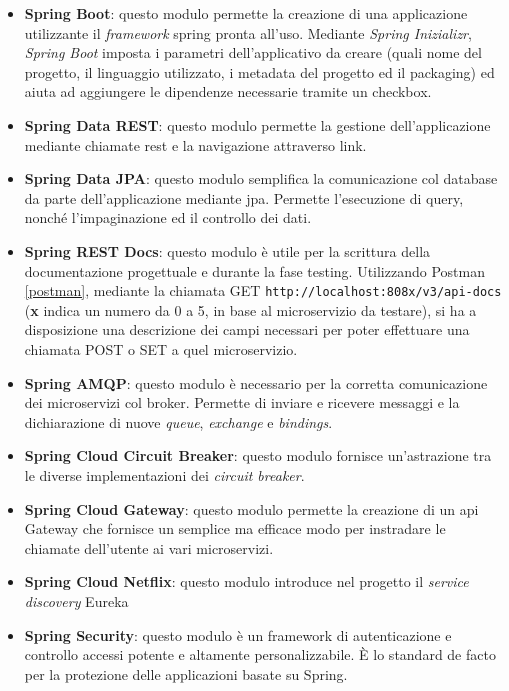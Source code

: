 \begin{itemize}
    \item \textbf{Spring Boot}: questo modulo permette la creazione di una applicazione utilizzante il \textit{framework} \Gls{spring} pronta all'uso. Mediante \textit{Spring Inizializr}, \textit{Spring Boot} imposta i parametri dell'applicativo da creare (quali nome del progetto, il linguaggio utilizzato, i metadata del progetto ed il packaging) ed aiuta ad aggiungere le dipendenze necessarie tramite un checkbox.
    \item \textbf{Spring Data REST}: questo modulo permette la gestione dell'applicazione mediante chiamate \acrshort{rest} e la navigazione attraverso link.
    \item \textbf{Spring Data JPA}: questo modulo semplifica la comunicazione col database da parte dell'applicazione mediante \Gls{jpa}. Permette l'esecuzione di query, nonché l'impaginazione ed il controllo dei dati.
    \item \textbf{Spring REST Docs}: questo modulo è utile per la scrittura della documentazione progettuale e durante la fase testing. Utilizzando Postman \ref{postman}, mediante la chiamata GET \texttt{http://localhost:808x/v3/api-docs} (\textbf{x} indica un numero da 0 a 5, in base al microservizio da testare), si ha a disposizione una descrizione dei campi necessari per poter effettuare una chiamata POST o SET a quel microservizio.
    \item \textbf{Spring AMQP}: questo modulo è necessario per la corretta comunicazione dei microservizi col broker. Permette di inviare e ricevere messaggi e la dichiarazione di nuove \textit{queue}, \textit{exchange} e \textit{bindings}.
    \item \textbf{Spring Cloud Circuit Breaker}: questo modulo fornisce un'astrazione tra le diverse implementazioni dei \textit{circuit breaker}.
    \item \textbf{Spring Cloud Gateway}: questo modulo permette la creazione di un \acrshort{api} Gateway che fornisce un semplice ma efficace modo per instradare le chiamate dell'utente ai vari microservizi.
    \item \textbf{Spring Cloud Netflix}: questo modulo introduce nel progetto il \textit{service discovery} Eureka
    \item \textbf{Spring Security}: questo modulo è un framework di autenticazione e controllo accessi potente e altamente personalizzabile. È lo standard de facto per la protezione delle applicazioni basate su Spring.
\end{itemize}
